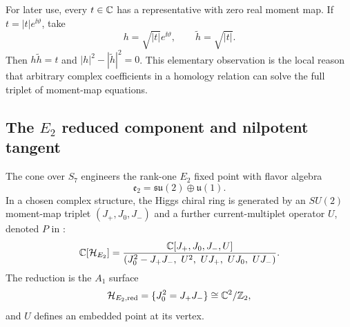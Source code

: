 For later use, every $t\in\mathbb C$ has a representative with zero real moment
map. If $t=|t|e^{\ii\vartheta}$, take
\begin{equation}
 h=\sqrt{|t|}e^{\ii\vartheta},
 \qquad
 \widetilde h=\sqrt{|t|}.
 \label{eq:conifold-balanced}
\end{equation}
Then $h\widetilde h=t$ and
$|h|^2-|\widetilde h|^2=0$. This elementary observation is the local reason
that arbitrary complex coefficients in a homology relation can solve the full
triplet of moment-map equations.

\subsection[The E2 reduced component and nilpotent tangent]{The $E_2$ reduced component and nilpotent tangent}
\label{subsec:e2-sector}

The cone over $S_7$ engineers the rank-one $E_2$ fixed point with flavor
algebra
\begin{equation}
 \mathfrak e_2=\mathfrak{su}(2)\oplus\mathfrak u(1).
\end{equation}
In a chosen complex structure, the Higgs chiral ring is generated by an
$SU(2)$ moment-map triplet $(J_+,J_0,J_-)$ and a further current-multiplet
operator $U$, denoted $P$ in \cite{Cremonesi:2015lsa}:
\begin{equation}
 \mathbb C[\mathcal H_{E_2}]
 =\frac{\mathbb C[J_+,J_0,J_-,U]}
 {(J_0^2-J_+J_-,\ U^2,\ UJ_+,\ UJ_0,\ UJ_-)}.
 \label{eq:e2-full-ring}
\end{equation}
The reduction is the $A_1$ surface
\begin{equation}
 \mathcal H_{E_2,\mathrm{red}}
 =\{J_0^2=J_+J_-\}
 \cong\mathbb C^2/\mathbb Z_2,
 \label{eq:e2-reduced}
\end{equation}
and $U$ defines an embedded point at its vertex.

